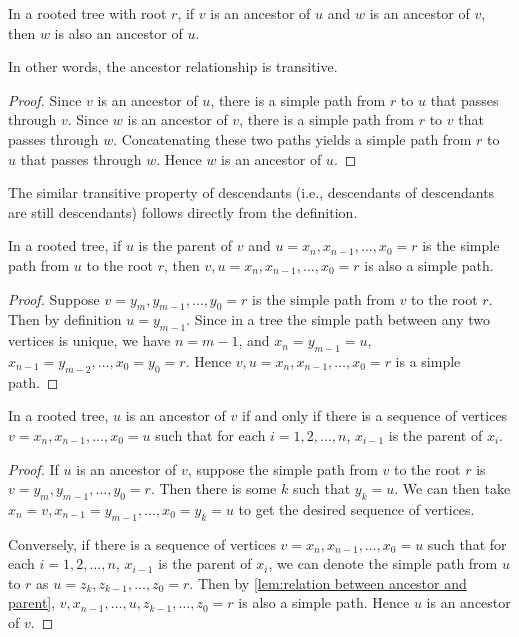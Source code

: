 \begin{theorem}
    In a rooted tree with root $r$, if $v$ is an ancestor of $u$ and $w$ is an ancestor of $v$, then $w$ is also an ancestor of $u$.
\end{theorem}

In other words, the ancestor relationship is transitive.

\begin{proof}
    Since $v$ is an ancestor of $u$, there is a simple path from $r$ to $u$ that passes through $v$. Since $w$ is an ancestor of $v$, there is a simple path from $r$ to $v$ that passes through $w$. Concatenating these two paths yields a simple path from $r$ to $u$ that passes through $w$. Hence $w$ is an ancestor of $u$.
\end{proof}

The similar transitive property of descendants (i.e., descendants of descendants are still descendants) follows directly from the definition.

\begin{lemma}\label{lem:relation between ancestor and parent}
    In a rooted tree, if $u$ is the parent of $v$ and $u=x_n, x_{n-1}, \dots, x_0=r$ is the simple path from $u$ to the root $r$, then $v, u=x_n, x_{n-1}, \dots, x_0=r$ is also a simple path. 
\end{lemma}

\begin{proof}
    Suppose $v=y_m, y_{m-1}, \dots, y_0=r$ is the simple path from $v$ to the root $r$. Then by definition $u=y_{m-1}$. Since in a tree the simple path between any two vertices is unique, we have $n=m-1$, and $x_n=y_{m-1}=u$, $x_{n-1}=y_{m-2}, \dots, x_0=y_0=r$. Hence $v, u=x_n, x_{n-1}, \dots, x_0=r$ is a simple path.
\end{proof}

\begin{theorem}
    In a rooted tree, $u$ is an ancestor of $v$ if and only if there is a sequence of vertices $v=x_n, x_{n-1}, \dots, x_0=u$ such that for each $i=1,2,\dots,n$, $x_{i-1}$ is the parent of $x_i$.
\end{theorem}

\begin{proof}
    If $u$ is an ancestor of $v$, suppose the simple path from $v$ to the root $r$ is $v=y_m, y_{m-1}, \dots, y_0=r$. Then there is some $k$ such that $y_k=u$. We can then take $x_n=v, x_{n-1}=y_{m-1}, \dots, x_0=y_k=u$ to get the desired sequence of vertices.

    Conversely, if there is a sequence of vertices $v=x_n, x_{n-1}, \dots, x_0=u$ such that for each $i=1,2,\dots,n$, $x_{i-1}$ is the parent of $x_i$, we can denote the simple path from $u$ to $r$ as $u=z_k, z_{k-1}, \dots, z_0=r$. Then by \cref{lem:relation between ancestor and parent}, $v, x_{n-1}, \dots, u, z_{k-1}, \dots, z_0=r$ is also a simple path. Hence $u$ is an ancestor of $v$.
\end{proof}

